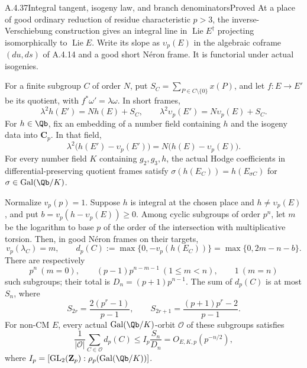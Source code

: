 \begin{result}{A.4.37}{Integral tangent, isogeny law, and branch denominators}{Proved}
At a place of good ordinary reduction of residue characteristic
$p>3$, the inverse-Verschiebung construction gives an integral line
in $\operatorname{Lie}E^\dagger$ projecting isomorphically to
$\operatorname{Lie}E$. Write its slope as $\upsilon_p(E)$ in the
algebraic coframe $(du,ds)$ of A.4.14 and a good short N\'eron frame.
It is functorial under actual isogenies.

For a finite subgroup $C$ of order $N$, put
$S_C=\sum_{P\in C\setminus\{0\}}x(P)$, and let $f:E\to E'$ be its
quotient, with $f^*\omega'=\lambda\omega$. In short frames,
\[
 \lambda^2h(E')=Nh(E)+S_C,\qquad
 \lambda^2\upsilon_p(E')=N\upsilon_p(E)+S_C.
\]
For $h\in\Qb$, fix an embedding of a number field containing
$h$ and the isogeny data into $\mathbf C_p$. In that field,
\begin{equation}\label{ell:ordinary-isogeny-difference}
 \lambda^2\bigl(h(E')-\upsilon_p(E')\bigr)
       =N\bigl(h(E)-\upsilon_p(E)\bigr).
\end{equation}
For every number field $K$ containing $g_2,g_3,h$, the actual Hodge
coefficients in differential-preserving quotient frames satisfy
$\sigma(h(E_C))=h(E_{\sigma C})$ for $\sigma\in\operatorname{Gal}(\Qb/K)$.

Normalize $v_p(p)=1$. Suppose $h$ is integral at the chosen place and
$h\ne\upsilon_p(E)$, and put $b=v_p(h-\upsilon_p(E))\ge0$.
Among cyclic subgroups of order $p^n$, let $m$ be the logarithm to
base $p$ of the order of the intersection with multiplicative torsion.
Then, in good N\'eron frames on their targets,
\[
 v_p(\lambda_C)=m,\qquad
 d_p(C):=\max\{0,-v_p(h(E_C))\}=\max\{0,2m-n-b\}.
\]
There are respectively
\[
 p^n\ (m=0),\qquad
 (p-1)p^{n-m-1}\ (1\le m<n),\qquad 1\ (m=n)
\]
such subgroups; their total is $D_n=(p+1)p^{n-1}$.
The sum of $d_p(C)$ is at most $S_n$, where
\[
 S_{2r}=\frac{2(p^r-1)}{p-1},\qquad
 S_{2r+1}=\frac{(p+1)p^r-2}{p-1}.
\]
For non-CM $E$, every actual $\operatorname{Gal}(\Qb/K)$-orbit
$\mathcal O$ of these subgroups satisfies
\[
 \frac1{|\mathcal O|}\sum_{C\in\mathcal O}d_p(C)
       \le I_p\frac{S_n}{D_n}=O_{E,K,p}(p^{-n/2}),
\]
where $I_p=[\mathrm{GL}_2(\mathbf Z_p):\rho_p(\operatorname{Gal}(\Qb/K))]$.
\end{result}

